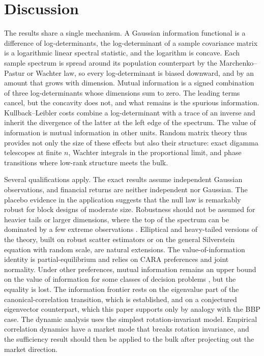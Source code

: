 \section*{Discussion}

The results share a single mechanism. A Gaussian information functional is a difference of log-determinants, the log-determinant of a sample covariance matrix is a logarithmic linear spectral statistic, and the logarithm is concave. Each sample spectrum is spread around its population counterpart by the Marchenko--Pastur or Wachter law, so every log-determinant is biased downward, and by an amount that grows with dimension. Mutual information is a signed combination of three log-determinants whose dimensions sum to zero. The leading terms cancel, but the concavity does not, and what remains is the spurious information. Kullback--Leibler costs combine a log-determinant with a trace of an inverse and inherit the divergence of the latter at the left edge of the spectrum. The value of information is mutual information in other units. Random matrix theory thus provides not only the size of these effects but also their structure: exact digamma telescopes at finite $n$, Wachter integrals in the proportional limit, and phase transitions where low-rank structure meets the bulk.

Several qualifications apply. The exact results assume independent Gaussian observations, and financial returns are neither independent nor Gaussian. The placebo evidence in the application suggests that the null law is remarkably robust for block designs of moderate size. Robustness should not be assumed for heavier tails or larger dimensions, where the top of the spectrum can be dominated by a few extreme observations \citep{biroli2007top}. Elliptical and heavy-tailed versions of the theory, built on robust scatter estimators or on the general Silverstein equation with random scale, are natural extensions. The value-of-information identity is partial-equilibrium and relies on CARA preferences and joint normality. Under other preferences, mutual information remains an upper bound on the value of information for some classes of decision problems \citep{cabrales2013entropy}, but the equality is lost. The information frontier rests on the eigenvalue part of the canonical-correlation transition, which is established, and on a conjectured eigenvector counterpart, which this paper supports only by analogy with the BBP case. The dynamic analysis uses the simplest rotation-invariant model. Empirical correlation dynamics have a market mode that breaks rotation invariance, and the sufficiency result should then be applied to the bulk after projecting out the market direction.

